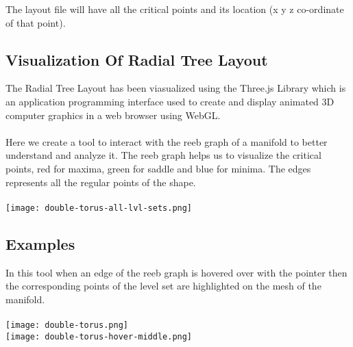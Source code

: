 \documentclass[a4paper]{article}
\begin{document}
\begin{multicols}{2}
The layout file will have all the critical points and its location (x y z co-ordinate of that point).


\subsection{Visualization Of Radial Tree Layout}
The Radial Tree Layout has been viasualized using the Three.js Library which is an application programming interface used to create and display animated 3D computer graphics in a web browser using WebGL. \\\\
Here we create a tool to interact with the reeb graph of a manifold to better understand and analyze it. The reeb graph helps us to visualize the critical points, red for maxima, green for saddle and blue for minima. The edges represents all the regular points of the shape. \\\\
\texttt{[image: double-torus-all-lvl-sets.png]}

\subsection{Examples}
In this tool when an edge of the reeb graph is hovered over with the pointer then the corresponding points of the level set are highlighted on the mesh of the manifold.\\\\
\texttt{[image: double-torus.png]} \\
\texttt{[image: double-torus-hover-middle.png]}

    




\printbibliography
\end{multicols}
\end{document}
